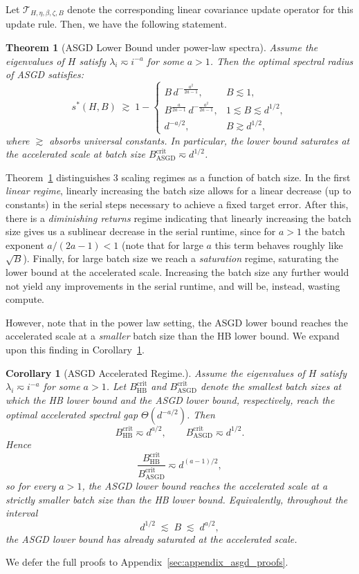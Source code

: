 \documentclass{article}
\newtheorem{theorem}{Theorem}
\newtheorem{corollary}{Corollary}
\begin{document}
Let $\mathcal{T}_{H,\eta,\beta,\zeta,B}$ denote the corresponding linear covariance update operator for this update rule. Then, we have the following statement.
\begin{theorem}[ASGD Lower Bound under power-law spectra]
\label{thm:asgd-powerlaw}
Assume the eigenvalues of $H$ satisfy $\lambda_i \eqsim i^{-a}$ for some $a>1$.
Then the optimal spectral radius of ASGD satisfies:
\[
s^*(H,B)
\;\gtrsim\;
1 -
\begin{cases}
B\, d^{-\frac{a^2}{2a-1}}, & B \lesssim 1,\\[6pt]
B^{\frac{a}{2a-1}}\, d^{-\frac{a^2}{2a-1}}, & 1 \lesssim B \lesssim d^{1/2},\\[6pt]
d^{-a/2}, & B \gtrsim d^{1/2},
\end{cases}
\]
where $\gtrsim$ absorbs universal constants. In particular, the lower bound saturates at the accelerated scale at batch size $
B_{\mathrm{ASGD}}^{\mathrm{crit}} \eqsim d^{1/2}$.
\end{theorem}
Theorem~\ref{thm:asgd-powerlaw} distinguishes $3$ scaling regimes as a function of batch size. In the first \textit{linear regime}, linearly increasing the batch size allows for a linear decrease (up to constants) in the serial steps necessary to achieve a fixed target error. After this, there is a \textit{diminishing returns} regime indicating that linearly increasing the batch size gives us a sublinear decrease in the serial runtime, since for $a>1$ the batch exponent $a/(2a-1) < 1$ (note that for large $a$ this term behaves roughly like $\sqrt{B}$). Finally, for large batch size we reach a \textit{saturation} regime, saturating the lower bound at the accelerated scale. Increasing the batch size any further would not yield any improvements in the serial runtime, and will be, instead, wasting compute. 

However, note that in the power law setting, the ASGD lower bound reaches the accelerated scale at a \textit{smaller} batch size than the HB lower bound. We expand upon this finding in Corollary~\ref{cor:asgd-earlier-than-hb}.

\begin{corollary}[ASGD Accelerated Regime.]
\label{cor:asgd-earlier-than-hb}
Assume the eigenvalues of $H$ satisfy $\lambda_i \eqsim i^{-a}$ for some $a>1$.
Let $B_{\mathrm{HB}}^{\mathrm{crit}}$ and $B_{\mathrm{ASGD}}^{\mathrm{crit}}$ denote the smallest batch sizes at which the HB lower bound and the ASGD lower bound, respectively, reach the optimal accelerated spectral gap $\Theta(d^{-a/2})$. Then
\[
B_{\mathrm{HB}}^{\mathrm{crit}} \eqsim d^{a/2},
\qquad
B_{\mathrm{ASGD}}^{\mathrm{crit}} \eqsim d^{1/2}.
\]
Hence
\[
\frac{B_{\mathrm{HB}}^{\mathrm{crit}}}{B_{\mathrm{ASGD}}^{\mathrm{crit}}}
\eqsim d^{(a-1)/2},
\]
so for every $a>1$, the ASGD lower bound reaches the accelerated scale at a strictly smaller batch size than the HB lower bound.
Equivalently, throughout the interval
\[
d^{1/2} \;\lesssim\; B \;\lesssim\; d^{a/2},
\]
the ASGD lower bound has already saturated at the accelerated scale.
\end{corollary}
We defer the full proofs to Appendix~\ref{sec:appendix_asgd_proofs}. 
\end{document}
